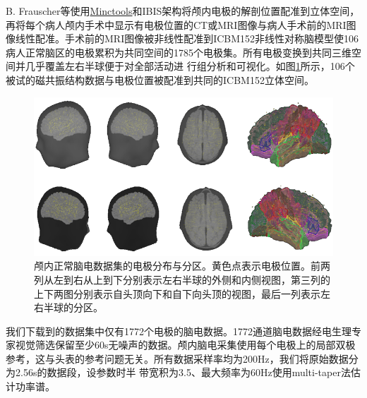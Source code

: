 B. Frauscher等使用\href{www.bic.mni.mcgill.ca/ServicesSoftware/Services SoftwareMincToolKit}{Minctools}和IBIS架构将颅内电极的解剖位置配准到立体空间，再将每个病人颅内手术中显示有电极位置的CT或MRI图像与病人手术前的MRI图像线性配准。手术前的MRI图像被非线性配准到ICBM152非线性对称脑模型使106病人正常脑区的电极累积为共同空间的1785个电极集。所有电极变换到共同三维空间并几乎覆盖左右半球便于对全部活动进
行组分析和可视化。如图\ref{7:ele}所示，106个被试的磁共振结构数据与电极位置被配准到共同的ICBM152立体空间。
\begin{figure}[!h]
\includegraphics[width=15cm]{pic/xipi/electrodes.png}
\caption{颅内正常脑电数据集的电极分布与分区。黄色点表示电极位置。前两列从左到右从上到下分别表示左右半球的外侧和内侧视图，第三列的上下两图分别表示自头顶向下和自下向头顶的视图，最后一列表示左右半球的分区。}
\label{7:ele}
\end{figure}

我们下载到的数据集中仅有1772个电极的脑电数据。1772通道脑电数据经电生理专家视觉筛选保留至少60s无噪声的数据。颅内脑电采集使用每个电极上的局部双极参考，这与头表的参考问题无关。所有数据采样率均为200Hz，我们将原始数据分为2.56s的数据段，设参数时半
带宽积为3.5、最大频率为60Hz使用multi-taper法估计功率谱。

